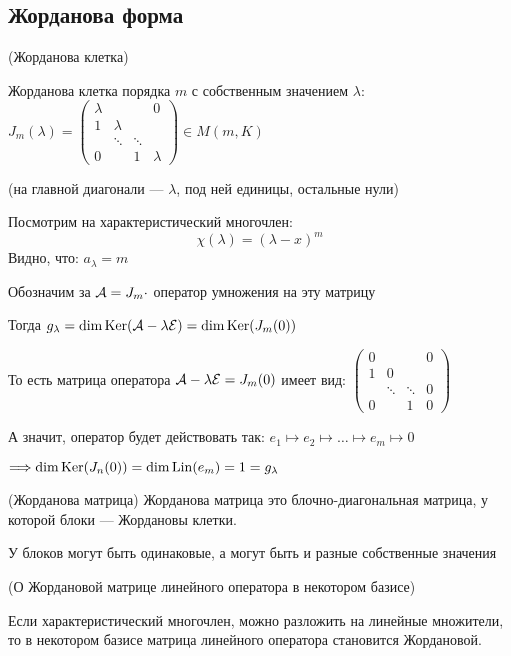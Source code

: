 \subsection{Жорданова форма}

\begin{conj}(Жорданова клетка)

    Жорданова клетка порядка $ m $ с собственным значением $ \lambda $: \\
    $ J_m(\lambda) = \left(\begin{array}{cccc}
    \lambda &  &  & 0 \\ 
    1 & \lambda &  &  \\ 
     & \ddots & \ddots &  \\ 
    0 &  & 1 & \lambda
    \end{array}\right) \in M(m, K) $
    
    (на главной диагонали --- $\lambda$, под ней единицы, остальные нули)
\end{conj}

\vspace*{3mm}
Посмотрим на характеристический многочлен:
    \[  \chi(\lambda) = (\lambda - x)^m \]
Видно, что: $ a_{\lambda} = m $

Обозначим за $\mathcal{A} = J_m \cdot$ оператор умножения на эту матрицу

Тогда $ g_{\lambda} = \dim \operatorname{Ker}(\mathcal{A} - \lambda\mathcal{E}) = \dim \operatorname{Ker}(J_{m}(0))$

То есть матрица оператора $\mathcal{A} - \lambda\mathcal{E} = J_{m} (0)$ имеет вид:
$ \left(\begin{array}{cccc}
0 &  &  & 0 \\
1 & 0 &  &  \\
 & \ddots & \ddots & 0 \\ 
0 &  & 1 & 0
\end{array}\right) $

А значит, оператор будет действовать так: $e_1 \mapsto e_2 \mapsto \dots \mapsto e_m \mapsto 0$

$\Longrightarrow \dim \operatorname{Ker}(J_{n}(0)) = \dim \operatorname{Lin} (e_m) = 1 = g_{\lambda}$

\begin{conj}(Жорданова матрица)
    Жорданова матрица это блочно-диагональная матрица, у которой блоки --- Жордановы клетки.

    У блоков могут быть одинаковые, а могут быть и разные собственные значения
\end{conj}

\begin{theorem}(О Жордановой матрице линейного оператора в некотором базисе)

    Если характеристический многочлен, можно разложить на линейные множители,
    то в некотором базисе матрица линейного оператора становится Жордановой.
\end{theorem}

